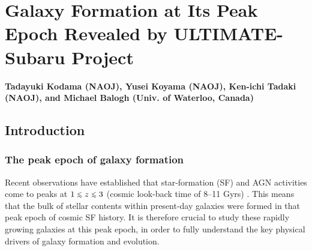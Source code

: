 \def\thisdir{science/hizpeak/}

%



\newcommand\lya{Ly$\alpha$}
\newcommand\ha{H$\alpha$}
\newcommand\hb{H$\beta$}
\newcommand\paa{Pa$\alpha$}
\newcommand\oii{[O~{\sc ii}]}
\newcommand\oiii{[O~{\sc iii}]}
\newcommand\nii{[N~{\sc ii}]}

\def\gsim{\mathrel{\raise0.35ex\hbox{$\scriptstyle >$}\kern-0.6em %
\lower0.40ex\hbox{{$\scriptstyle \sim$}}}}
\def\lsim{\mathrel{\raise0.35ex\hbox{$\scriptstyle <$}\kern-0.6em %
\lower0.40ex\hbox{{$\scriptstyle \sim$}}}}
\def\msun{{\rm M}$_{\odot}$}

%
\section{Galaxy Formation at Its Peak Epoch Revealed by ULTIMATE-Subaru
 Project \label{sec:highzpeak}}

\noindent
\begin{center}
{\bf Tadayuki Kodama (NAOJ), Yusei Koyama (NAOJ), Ken-ichi Tadaki (NAOJ),
and Michael Balogh (Univ. of Waterloo, Canada)}
\end{center}
\vspace{0.5cm}

\normalsize
\subsection{Introduction}
\subsubsection{The peak epoch of galaxy formation}

Recent observations have established that star-formation (SF) and AGN
activities come to peaks at $1\lsim z\lsim 3$ (cosmic look-back time of 8--11 Gyrs)
\citep[e.g.,][]{madau96,lilly96,hopkins06}.
This means that the bulk of stellar contents within
present-day galaxies were formed in that peak epoch of cosmic SF
history. It is therefore crucial to study these rapidly growing
galaxies at this peak epoch, in order to fully
understand the key physical drivers of galaxy formation and evolution.

